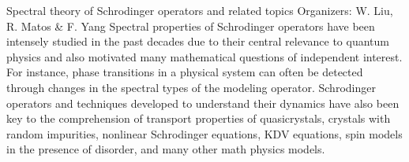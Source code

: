 \label{mini07}

\miniabs
{Spectral theory of Schrodinger operators and related topics}
{Organizers: W. Liu, R. Matos \& F. Yang}
{Spectral properties of Schrodinger operators have been intensely studied in the past decades due to their central relevance to quantum physics and also motivated many mathematical questions of independent interest. For instance, phase transitions in a physical system can often be detected through changes in the spectral types of the modeling operator. Schrodinger operators and techniques developed to understand their dynamics have also been key to the comprehension of transport properties of quasicrystals, crystals with random impurities, nonlinear Schrodinger equations, KDV equations, spin models in the presence of disorder, and many other math physics models.}

